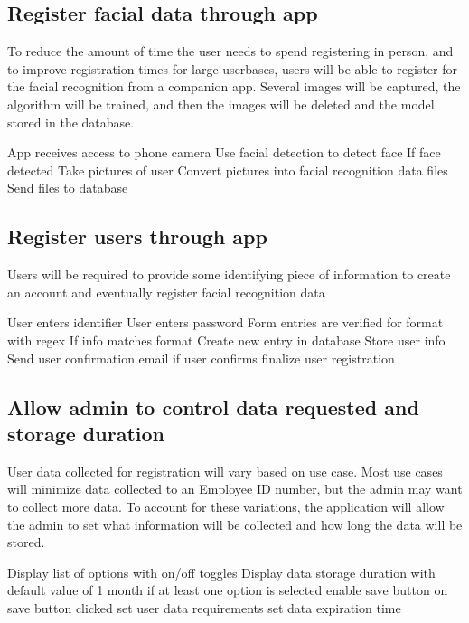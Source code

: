 \documentclass[12pt, letterpaper]{article}
\begin{document}
    \subsection{Register facial data through app}
    To reduce the amount of time the user needs to spend registering in person, and to improve registration
    times for large userbases, users will be able to register for the facial recognition from a companion app.  
    Several images will be captured, the algorithm will be trained, and then the images will be deleted and the model
    stored in the database.
    \begin{algorithm}[caption={Register facial data}, label={alg1}]
        App receives access to phone camera
        Use facial detection to detect face
        If face detected
            Take pictures of user
            Convert pictures into facial recognition data files
            Send files to database
    \end{algorithm}
    \subsection{Register users through app}
    Users will be required to provide some identifying piece of information to create an account and eventually register
    facial recognition data
    \begin{algorithm}[caption={Register user data}, label={alg1}]
        User enters identifier
        User enters password
        Form entries are verified for format with regex
        If info matches format
            Create new entry in database
            Store user info
            Send user confirmation email
        if user confirms
            finalize user registration
    \end{algorithm}
    \subsection{Allow admin to control data requested and storage duration}
    User data collected for registration will vary based on use case.  Most use cases will minimize data collected
    to an Employee ID number, but the admin may want to collect more data.  To account for these variations, the 
    application will allow the admin to set what information will be collected and how long the data will be stored.
    \begin{algorithm}[caption={Manage User data settings}, label={alg1}]
        Display list of options with on/off toggles
        Display data storage duration with default value of 1 month
        if at least one option is selected
            enable save button
        on save button clicked
            set user data requirements
            set data expiration time
    \end{algorithm}
\end{document}
